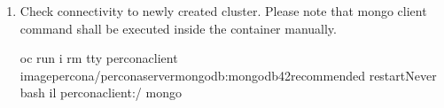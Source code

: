 \documentclass[letterpaper,10pt,english]{sphinxmanual}
\begin{document}
\begin{enumerate}
\item {} 
Check connectivity to newly created cluster. Please note that mongo client command shall be executed inside the container manually.

\begin{sphinxVerbatim}[commandchars=\\\{\}]
\PYGZdl{} oc run \PYGZhy{}i \PYGZhy{}\PYGZhy{}rm \PYGZhy{}\PYGZhy{}tty percona\PYGZhy{}client \PYGZhy{}\PYGZhy{}imagepercona/percona\PYGZhy{}server\PYGZhy{}mongodb:mongodb42recommended \PYGZhy{}\PYGZhy{}restartNever \PYGZhy{}\PYGZhy{} bash \PYGZhy{}il
percona\PYGZhy{}client:/\PYGZdl{} mongo 
\end{sphinxVerbatim}

\end{enumerate}
\end{document}
